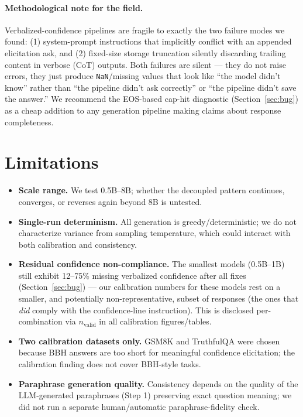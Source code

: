 \documentclass{article}
\begin{document}
\paragraph{Methodological note for the field.} Verbalized-confidence pipelines are fragile to exactly the two failure modes we found: (1) system-prompt instructions that implicitly conflict with an appended elicitation ask, and (2) fixed-size storage truncation silently discarding trailing content in verbose (CoT) outputs. Both failures are silent --- they do not raise errors, they just produce \texttt{NaN}/missing values that look like ``the model didn't know'' rather than ``the pipeline didn't ask correctly'' or ``the pipeline didn't save the answer.'' We recommend the EOS-based cap-hit diagnostic (Section~\ref{sec:bug}) as a cheap addition to any generation pipeline making claims about response completeness.

\section{Limitations}

\begin{itemize}
    \item \textbf{Scale range.} We test 0.5B--8B; whether the decoupled pattern continues, converges, or reverses again beyond 8B is untested.
    \item \textbf{Single-run determinism.} All generation is greedy/deterministic; we do not characterize variance from sampling temperature, which could interact with both calibration and consistency.
    \item \textbf{Residual confidence non-compliance.} The smallest models (0.5B--1B) still exhibit 12--75\% missing verbalized confidence after all fixes (Section~\ref{sec:bug}) --- our calibration numbers for these models rest on a smaller, and potentially non-representative, subset of responses (the ones that \emph{did} comply with the confidence-line instruction). This is disclosed per-combination via $n_{\text{valid}}$ in all calibration figures/tables.
    \item \textbf{Two calibration datasets only.} GSM8K and TruthfulQA were chosen because BBH answers are too short for meaningful confidence elicitation; the calibration finding does not cover BBH-style tasks.
    \item \textbf{Paraphrase generation quality.} Consistency depends on the quality of the LLM-generated paraphrases (Step 1) preserving exact question meaning; we did not run a separate human/automatic paraphrase-fidelity check.
\end{itemize}
\end{document}
